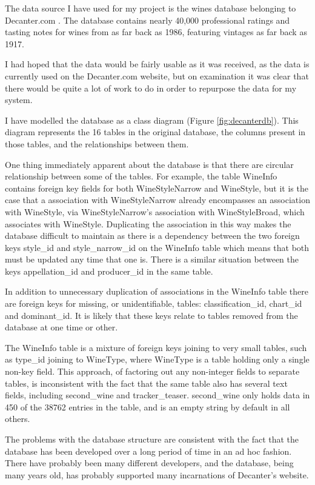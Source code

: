 The data source I have used for my project is the wines database belonging to Decanter.com \cite{DecanterWine}. The database contains nearly 40,000 professional ratings and tasting notes for wines from as far back as 1986, featuring vintages as far back as 1917.

I had hoped that the data would be fairly usable as it was received, as the data is currently used on the Decanter.com website, but on examination it was clear that there would be quite a lot of work to do in order to repurpose the data for my system.

I have modelled the database as a class diagram (Figure \ref{fig:decanterdb}). This diagram represents the 16 tables in the original database, the columns present in those tables, and the relationships between them.

One thing immediately apparent about the database is that there are circular relationship between some of the tables. For example, the table WineInfo contains foreign key fields for both WineStyleNarrow and WineStyle, but it is the case that a association with WineStyleNarrow already encompasses an association with WineStyle, via WineStyleNarrow's association with WineStyleBroad, which associates with WineStyle. Duplicating the association in this way makes the database difficult to maintain as there is a dependency between the two foreign keys style\_id and style\_narrow\_id on the WineInfo table which means that both must be updated any time that one is. There is a similar situation between the keys appellation\_id and producer\_id in the same table.

In addition to unnecessary duplication of associations in the WineInfo table there are foreign keys for missing, or unidentifiable, tables: classification\_id, chart\_id and dominant\_id. It is likely that these keys relate to tables removed from the database at one time or other.

The WineInfo table is a mixture of foreign keys joining to very small tables, such as type\_id joining to WineType, where WineType is a table holding only a single non-key field. This approach, of factoring out any non-integer fields to separate tables, is inconsistent with the fact that the same table also has several text fields, including second\_wine and tracker\_teaser. second\_wine only holds data in 450 of the 38762 entries in the table, and is an empty string by default in all others.

The problems with the database structure are consistent with the fact that the database has been developed over a long period of time in an ad hoc fashion. There have probably been many different developers, and the database, being many years old, has probably supported many incarnations of Decanter's website.

